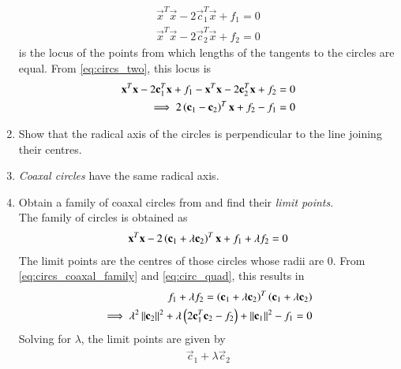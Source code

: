 \begin{enumerate}[label=\arabic*.,ref=\thesubsection.\theenumi]
\begin{align}
\label{eq:circs_two}
\vec{x}^T\vec{x}-2\vec{c}_1^T\vec{x} + f_1 = 0
\\
\vec{x}^T\vec{x}-2\vec{c}_2^T\vec{x} + f_2 = 0
\end{align}
%
is the locus of the points from which lengths of the tangents to the circles are equal.  From \eqref{eq:circs_two}, this locus is
\begin{align}
\mathbf{x}^T\mathbf{x}-2\mathbf{c}_1^T\mathbf{x} + f_1 -
\mathbf{x}^T\mathbf{x}-2\mathbf{c}_2^T\mathbf{x} + f_2 = 0
\\
\implies 2\left(\mathbf{c}_1-\mathbf{c}_2\right)^T\mathbf{x} + f_2 - f_1 = 0
\label{eq:circs_rad_axis}
\end{align}
\item Show that the radical axis of the circles is perpendicular to the line joining their centres.\item {\em Coaxal circles} have the same radical axis.
\item Obtain a family of coaxal circles from \label{eq:circs_two} and find their {\em limit points}.
\\
\solution The family of circles is obtained as
\begin{align}
\label{eq:circs_coaxal_family}
\mathbf{x}^T\mathbf{x}-2\left(\mathbf{c}_1 +\lambda\mathbf{c}_2\right)^T\mathbf{x} + f_1 +\lambda f_2= 0
\end{align}
%
The limit points are the centres of those circles whose radii are 0. From \eqref{eq:circs_coaxal_family} and \eqref{eq:circ_quad},
this results in
\begin{align}
\label{eq:circs_coaxal_family}
f_1 +\lambda f_2 =  \left(\mathbf{c}_1 +\lambda\mathbf{c}_2\right)^T\left(\mathbf{c}_1 +\lambda\mathbf{c}_2\right) &
\\
\implies \lambda^2 \left\lVert\mathbf{c}_2\right\rVert^2 + \lambda \left(2\mathbf{c}_1^T\mathbf{c}_2-f_2\right) + \left\lVert\mathbf{c}_1\right\rVert^2-f_1 = 0&
\end{align}
Solving for $\lambda$, the limit points are given by  
\begin{align}
\vec{c}_1+\lambda\vec{c}_2
\end{align}
\end{enumerate}


